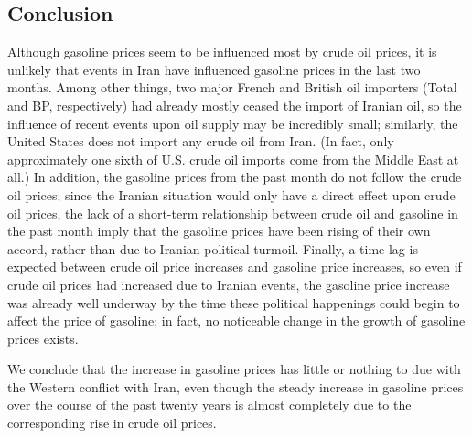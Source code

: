 \documentclass[11pt,twocolumn]{article}
\newcommand{\tab}[0] {\hspace*{24pt}}
\begin{document}
\begin{multicols}{2}
\subsection*{Conclusion}
\tab Although gasoline prices seem to be influenced most by crude oil prices, it is unlikely that events in Iran have influenced gasoline prices in the last two months. Among other things, two major French and British oil importers (Total and BP, respectively) had already mostly ceased the import of Iranian oil, so the influence of recent events upon oil supply may be incredibly small; similarly, the United States does not import any crude oil from Iran. (In fact, only approximately one sixth of U.S. crude oil imports come from the Middle East at all.) In addition, the gasoline prices from the past month do not follow the crude oil prices; since the Iranian situation would only have a direct effect upon crude oil prices, the lack of a short-term relationship between crude oil and gasoline in the past month imply that the gasoline prices have been rising of their own accord, rather than due to Iranian political turmoil. Finally, a time lag is expected between crude oil price increases and gasoline price increases, so even if crude oil prices had increased due to Iranian events, the gasoline price increase was already well underway by the time these political happenings could begin to affect the price of gasoline; in fact, no noticeable change in the growth of gasoline prices exists. 

\tab We conclude that the increase in gasoline prices has little or nothing to due with the Western conflict with Iran, even though the steady increase in gasoline prices over the course of the past twenty years is almost completely due to the corresponding rise in crude oil prices.
\end{multicols}
\end{document}
